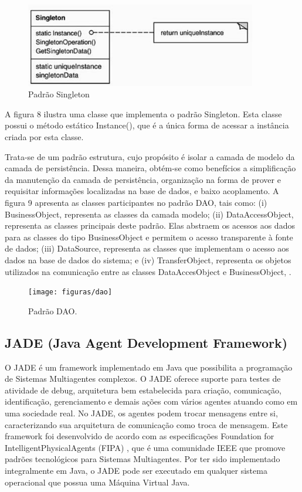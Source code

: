 \begin{figure}[h]
\centering
\label{f08}
\includegraphics[width=0.9\textwidth]{figuras/singleton}
\caption{Padrão Singleton}
\end{figure}

A figura 8 ilustra uma classe que implementa o padrão Singleton. Esta classe possui o método estático Instance(), que é a única forma de acessar a instância criada por esta classe.



Trata-se de um padrão estrutura, cujo propósito é isolar a camada de modelo da camada de persistência. Dessa maneira, obtém-se como benefícios a simplificação da manutenção da camada de persistência,  organização na forma de prover e requisitar informações localizadas na base de dados, e baixo acoplamento. A figura 9 apresenta as classes participantes no padrão DAO, tais como: (i) BusinessObject, representa as classes da camada modelo; (ii) DataAccessObject, representa as classes principais deste padrão. Elas abstraem os acessos aos dados para as classes do tipo BusinessObject e permitem o acesso transparente à fonte de dados; (iii) DataSource, representa as classes que implementam o acesso aos dados na base de dados do sistema; e (iv) TransferObject, representa os objetos utilizados na comunicação entre as classes DataAccesObject e BusinessObject, \cite{oracle2015}.

\begin{figure}[h!]
\centering
\label{f09}
\texttt{[image: figuras/dao]}
\caption{Padrão DAO.}
\end{figure}


\subsection{JADE (Java Agent Development Framework)}

O JADE \cite{telecon2014} é um framework implementado em Java que possibilita a programação de Sistemas Multiagentes complexos. O JADE oferece suporte para testes de atividade de debug, arquitetura bem estabelecida para criação, comunicação, identificação, gerenciamento e demais ações com vários agentes atuando como em uma sociedade real. No JADE, os agentes podem trocar mensagens entre si, caracterizando sua arquitetura de comunicação como troca de mensagem. Este framework foi desenvolvido de acordo com as especificações Foundation for IntelligentPhysicalAgents (FIPA) \cite{telecon2014}, que é uma comunidade IEEE que promove padrões tecnológicos para Sistemas Multiagentes. Por ter sido implementado integralmente em Java, o JADE pode ser executado em qualquer sistema operacional que possua uma Máquina Virtual Java.

